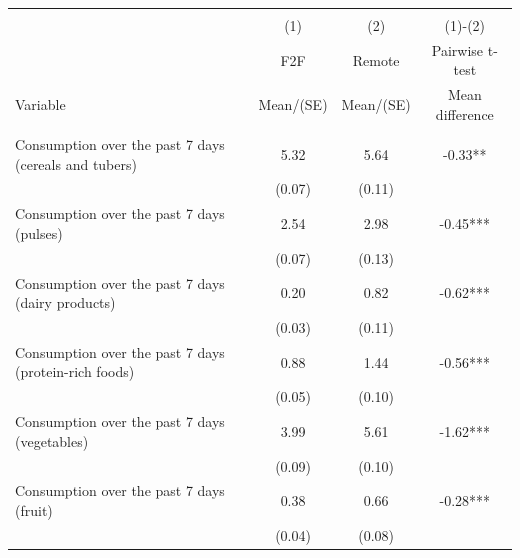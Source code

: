 
\begin{tabular}{@{\extracolsep{5pt}}lccc}
\\[-1.8ex]\hline \hline \\[-1.8ex]
 & \multicolumn{1}{c}{(1)}  & \multicolumn{1}{c}{(2)}  & \multicolumn{1}{c}{(1)-(2)} \\
 & \multicolumn{1}{c}{F2F}  & \multicolumn{1}{c}{Remote}  & \multicolumn{1}{c}{Pairwise t-test}  \\
Variable & Mean/(SE) & Mean/(SE) & Mean difference \\ \hline \\[-1.8ex] 
Consumption over the past 7 days (cereals and tubers)   & 5.32    & 5.64    & -0.33**   \\
 & (0.07)  & (0.11)  &  \\ [1ex]
Consumption over the past 7 days (pulses)   & 2.54    & 2.98    & -0.45***   \\
 & (0.07)  & (0.13)  &  \\ [1ex]
Consumption over the past 7 days (dairy products)   & 0.20    & 0.82    & -0.62***   \\
 & (0.03)  & (0.11)  &  \\ [1ex]
Consumption over the past 7 days (protein-rich foods)   & 0.88    & 1.44    & -0.56***   \\
 & (0.05)  & (0.10)  &  \\ [1ex]
Consumption over the past 7 days (vegetables)   & 3.99    & 5.61    & -1.62***   \\
 & (0.09)  & (0.10)  &  \\ [1ex]
Consumption over the past 7 days (fruit)   & 0.38    & 0.66    & -0.28***   \\
 & (0.04)  & (0.08)  &  \\ [1ex]

\end{tabular}

